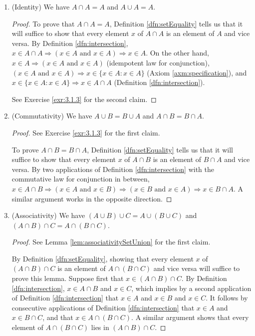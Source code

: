 \documentclass[../main.tex]{subfiles}
\begin{document}
\begin{enumerate}[ref={\thesection.\arabic*}]
\begin{prp}
\begin{enumerate}[label={\textup{(}\alph*\textup{)}},ref={\theenumi\alph*}]
            \item \label{exr:3.1.6c}(Identity) We have $A\cap A=A$ and $A\cup A=A$.
            \begin{proof}
                To prove that $A\cap A=A$, Definition \ref{dfn:setEquality} tells us that it will suffice to show that every element $x$ of $A\cap A$ is an element of $A$ and vice versa. By Definition \ref{dfn:intersection}, $x\in A\cap A \Longrightarrow (x\in A\text{ and }x\in A) \Longrightarrow x\in A$. On the other hand, $x\in A \Longrightarrow (x\in A\text{ and }x\in A)$ (idempotent law for conjunction), $(x\in A\text{ and }x\in A) \Longrightarrow x\in\{x\in A:x\in A\}$ (Axiom \ref{axm:specification}), and $x\in\{x\in A:x\in A\} \Longrightarrow x\in A\cap A$ (Definition \ref{dfn:intersection}).\par
                See Exercise \ref{exr:3.1.3} for the second claim.
            \end{proof}
            \item \label{exr:3.1.6d}(Commutativity) We have $A\cup B=B\cup A$ and $A\cap B=B\cap A$.
            \begin{proof}
                See Exercise \ref{exr:3.1.3} for the first claim.\par
                To prove $A\cap B=B\cap A$, Definition \ref{dfn:setEquality} tells us that it will suffice to show that every element $x$ of $A\cap B$ is an element of $B\cap A$ and vice versa. By two applications of Definition \ref{dfn:intersection} with the commutative law for conjunction in between, $x\in A\cap B \Longrightarrow (x\in A\text{ and }x\in B) \Longrightarrow (x\in B\text{ and }x\in A) \Longrightarrow x\in B\cap A$. A similar argument works in the opposite direction.
            \end{proof}
            \item \label{exr:3.1.6e}(Associativity) We have $(A\cup B)\cup C=A\cup(B\cup C)$ and $(A\cap B)\cap C=A\cap(B\cap C)$.
            \begin{proof}
                See Lemma \ref{lem:associativitySetUnion} for the first claim.\par
                By Definition \ref{dfn:setEquality}, showing that every element $x$ of $(A\cap B)\cap C$ is an element of $A\cap(B\cap C)$ and vice versa will suffice to prove this lemma. Suppose first that $x\in (A\cap B)\cap C$. By Definition \ref{dfn:intersection}, $x\in A\cap B$ and $x\in C$, which implies by a second application of Definition \ref{dfn:intersection} that $x\in A$ and $x\in B$ and $x\in C$. It follows by consecutive applications of Definition \ref{dfn:intersection} that $x\in A$ and $x\in B\cap C$, and that $x\in A\cap(B\cap C)$. A similar argument shows that every element of $A\cap(B\cap C)$ lies in $(A\cap B)\cap C$.

\end{proof}
\end{enumerate}
\end{prp}
\end{enumerate}
\end{document}
